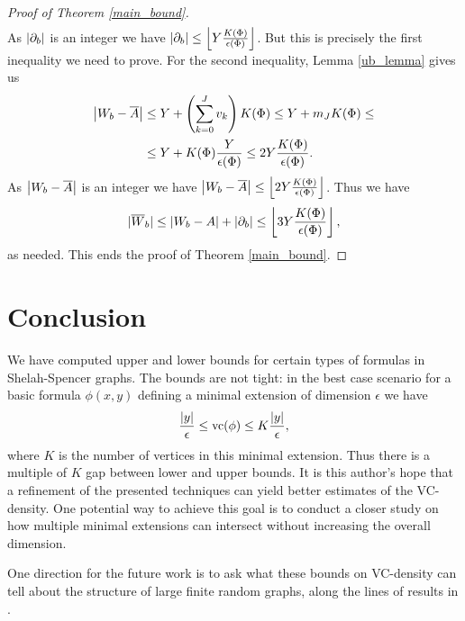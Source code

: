 \begin{proof} [Proof of Theorem \ref{main_bound}]
\begin{align*}
  \end{align*}
  As $|\partial_b|$ is an integer we have $|\partial_b| \leq \left \lfloor Y \frac{K(\Phi)}{\epsilon(\Phi)} \right \rfloor$.
  But this is precisely the first inequality we need to prove.
  For the second inequality, Lemma \ref{ub_lemma} gives us
  \begin{align*}
    \left|W_b - \overline{A}\right| &\leq Y + \left(\sum_{k=0}^J v_{k}\right) K(\Phi) \leq Y + m_J K(\Phi) \leq \\
    &\leq Y + K(\Phi) \frac{Y}{\epsilon(\Phi)} \leq 2Y \frac{K(\Phi)}{\epsilon(\Phi)}.
  \end{align*}
  As $\left|W_b - \overline{A}\right|$ is an integer we have $\left|W_b - \overline{A}\right| \leq \left \lfloor 2 Y \frac{K(\Phi)}{\epsilon(\Phi)} \right \rfloor$.
  Thus we have
  \begin{align*}
      |{\overline{W}}_b| \leq \left|W_b - A\right| + \left|\partial_b\right| \leq \left \lfloor 3 Y \frac{K(\Phi)}{\epsilon(\Phi)} \right \rfloor,
  \end{align*}
  as needed.
  This ends the proof of Theorem \ref{main_bound}.
\end{proof}


\section{Conclusion}
We have computed upper and lower bounds for certain types of formulas in Shelah-Spencer graphs.
The bounds are not tight: in the best case scenario for a basic formula $\phi(x,y)$ defining a minimal extension of
dimension $\epsilon$ we have
\begin{align*}
  \frac{|y|}{\epsilon} \leq \operatorname{vc}(\phi) \leq K \frac{|y|}{\epsilon},
\end{align*}
where $K$ is the number of vertices in this minimal extension.
Thus there is a multiple of $K$ gap between lower and upper bounds.
It is this author's hope that a refinement of the presented techniques can yield better estimates of the VC-density.
One potential way to achieve this goal is to conduct a closer study on
how multiple minimal extensions can intersect without increasing the overall dimension.

One direction for the future work is to ask what these bounds on VC-density can tell about
the structure of large finite random graphs, along the lines of results in \cite{anthony}.

